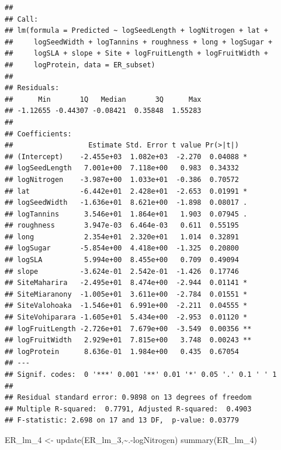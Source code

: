 \documentclass[
  12pt,
]{article}
\newenvironment{Shaded}{\begin{snugshade}}{\end{snugshade}}
\newcommand{\FunctionTok}[1]{\textcolor[rgb]{0.00,0.00,0.00}{#1}}
\newcommand{\NormalTok}[1]{#1}
\newcommand{\OtherTok}[1]{\textcolor[rgb]{0.56,0.35,0.01}{#1}}
\newcommand{\SpecialCharTok}[1]{\textcolor[rgb]{0.00,0.00,0.00}{#1}}
\begin{document}
\begin{verbatim}
## 
## Call:
## lm(formula = Predicted ~ logSeedLength + logNitrogen + lat + 
##     logSeedWidth + logTannins + roughness + long + logSugar + 
##     logSLA + slope + Site + logFruitLength + logFruitWidth + 
##     logProtein, data = ER_subset)
## 
## Residuals:
##      Min       1Q   Median       3Q      Max 
## -1.12655 -0.44307 -0.08421  0.35848  1.55283 
## 
## Coefficients:
##                  Estimate Std. Error t value Pr(>|t|)   
## (Intercept)    -2.455e+03  1.082e+03  -2.270  0.04088 * 
## logSeedLength   7.001e+00  7.118e+00   0.983  0.34332   
## logNitrogen    -3.987e+00  1.033e+01  -0.386  0.70572   
## lat            -6.442e+01  2.428e+01  -2.653  0.01991 * 
## logSeedWidth   -1.636e+01  8.621e+00  -1.898  0.08017 . 
## logTannins      3.546e+01  1.864e+01   1.903  0.07945 . 
## roughness       3.947e-03  6.464e-03   0.611  0.55195   
## long            2.354e+01  2.320e+01   1.014  0.32891   
## logSugar       -5.854e+00  4.418e+00  -1.325  0.20800   
## logSLA          5.994e+00  8.455e+00   0.709  0.49094   
## slope          -3.624e-01  2.542e-01  -1.426  0.17746   
## SiteMaharira   -2.495e+01  8.474e+00  -2.944  0.01141 * 
## SiteMiaranony  -1.005e+01  3.611e+00  -2.784  0.01551 * 
## SiteValohoaka  -1.546e+01  6.991e+00  -2.211  0.04555 * 
## SiteVohiparara -1.605e+01  5.434e+00  -2.953  0.01120 * 
## logFruitLength -2.726e+01  7.679e+00  -3.549  0.00356 **
## logFruitWidth   2.929e+01  7.815e+00   3.748  0.00243 **
## logProtein      8.636e-01  1.984e+00   0.435  0.67054   
## ---
## Signif. codes:  0 '***' 0.001 '**' 0.01 '*' 0.05 '.' 0.1 ' ' 1
## 
## Residual standard error: 0.9898 on 13 degrees of freedom
## Multiple R-squared:  0.7791, Adjusted R-squared:  0.4903 
## F-statistic: 2.698 on 17 and 13 DF,  p-value: 0.03779
\end{verbatim}

\begin{Shaded}
\begin{Highlighting}[]
\NormalTok{ER\_lm\_4 }\OtherTok{\textless{}{-}} \FunctionTok{update}\NormalTok{(ER\_lm\_3,}\SpecialCharTok{\textasciitilde{}}\NormalTok{.}\SpecialCharTok{{-}}\NormalTok{logNitrogen)}
\FunctionTok{summary}\NormalTok{(ER\_lm\_4)}
\end{Highlighting}
\end{Shaded}
\end{document}
